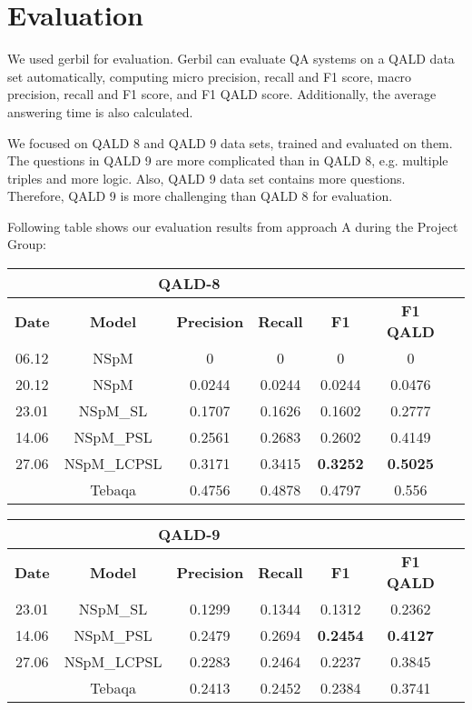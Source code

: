 
\section{Evaluation}

We used gerbil for evaluation.
Gerbil can evaluate QA systems on a QALD data set automatically,
computing micro precision, recall and F1 score, 
macro precision, recall and F1 score,
and F1 QALD score. 
Additionally, the average answering time is also calculated. 

We focused on QALD 8 and QALD 9 data sets, trained and evaluated on them. 
The questions in QALD 9 are more complicated than in QALD 8, 
e.g. multiple triples and more logic. 
Also, QALD 9 data set contains more questions.
Therefore, QALD 9 is more challenging than QALD 8 for evaluation. 

Following table shows our evaluation results from approach A during the Project Group:

\begin{tabular}{ccccccc} \hline
    \multicolumn{5}{c}{QALD-8} \\ \hline
    \textbf{Date} & \textbf{Model}  & \textbf{Precision} & \textbf{Recall} & \textbf{F1} & \textbf{F1 QALD} \\ \hline
    06.12       & NSpM          & 0         & 0         & 0         & 0         \\
    20.12       & NSpM          & 0.0244    & 0.0244    & 0.0244    & 0.0476    \\
    23.01       & NSpM\_SL       & 0.1707    & 0.1626    & 0.1602    & 0.2777    \\
    14.06       & NSpM\_PSL      & 0.2561    & 0.2683    & 0.2602    & 0.4149    \\
    27.06       & NSpM\_LCPSL    & 0.3171    & 0.3415    & \textbf{0.3252}    & \textbf{0.5025}    \\
    \hline
                & Tebaqa        & 0.4756     & 0.4878    & 0.4797   & 0.556   \\
    \hline
\end{tabular}

\break

\begin{tabular}{ccccccc} \hline
    \multicolumn{5}{c}{QALD-9} \\ \hline
    \textbf{Date} & \textbf{Model}  & \textbf{Precision} & \textbf{Recall} & \textbf{F1} & \textbf{F1 QALD} \\ \hline
    23.01       & NSpM\_SL       & 0.1299    & 0.1344    & 0.1312    & 0.2362    \\
    14.06       & NSpM\_PSL      & 0.2479    & 0.2694	 & \textbf{0.2454}    & \textbf{0.4127}    \\
    27.06       & NSpM\_LCPSL    & 0.2283    & 0.2464    & 0.2237    & 0.3845    \\
    \hline
                & Tebaqa        & 0.2413    & 0.2452    & 0.2384    & 0.3741  \\
    \hline
\end{tabular}

